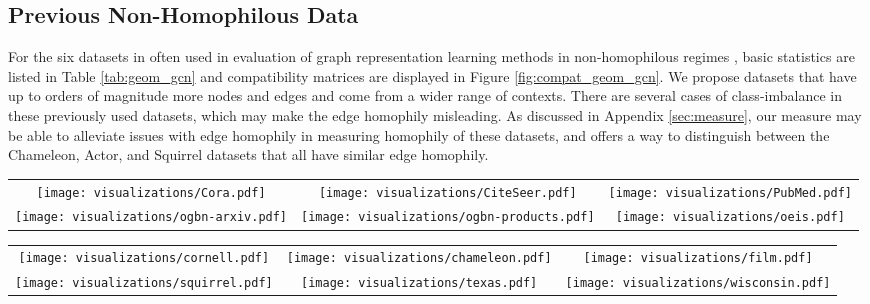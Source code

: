 \documentclass{article}
\begin{document}
\subsection{Previous Non-Homophilous Data}

For the six datasets in \citet{pei2019geom} often used in evaluation of graph representation learning methods in non-homophilous regimes \cite{zhu2020beyond}, basic statistics are listed in Table \ref{tab:geom_gcn} and compatibility matrices are displayed in Figure \ref{fig:compat_geom_gcn}. We propose datasets that have up to orders of magnitude more nodes and edges and come from a wider range of contexts. There are several cases of class-imbalance in these previously used datasets, which may make the edge homophily misleading. As discussed in Appendix \ref{sec:measure}, our measure may be able to alleviate issues with edge homophily in measuring homophily of these datasets, and offers a way to distinguish between the Chameleon, Actor, and Squirrel datasets that all have similar edge homophily.

\begin{figure*}[t]
\centering
\begin{tabular}{ccc}
    \texttt{[image: visualizations/Cora.pdf]} &
    \texttt{[image: visualizations/CiteSeer.pdf]} &
    \texttt{[image: visualizations/PubMed.pdf]} \\
    \texttt{[image: visualizations/ogbn-arxiv.pdf]} &
    \texttt{[image: visualizations/ogbn-products.pdf]} &
    \texttt{[image: visualizations/oeis.pdf]}
\end{tabular}
\caption{Compatibility matrices of homophilic datasets. The diagonal dominance indicates strong homophily.}
\label{fig:compat_homophilic}
\end{figure*}

\begin{figure*}[t]
\centering
\begin{tabular}{ccc}
    \texttt{[image: visualizations/cornell.pdf]} &
    \texttt{[image: visualizations/chameleon.pdf]} &
    \texttt{[image: visualizations/film.pdf]} \\
    \texttt{[image: visualizations/squirrel.pdf]} &
    \texttt{[image: visualizations/texas.pdf]}  &
    \texttt{[image: visualizations/wisconsin.pdf]}
\end{tabular}
\caption{Compatibility matrices of datasets in \citet{pei2019geom} (collected by \cite{rozemberczki2019multi, tang2009social, mitchell1997web}). The ``film'' dataset is also referred to as ``Actor''. Note that there are no edges leading out of the nodes of class 1 in the Cornell dataset, so there is an empty row in its matrix.}
\label{fig:compat_geom_gcn}
\end{figure*}
\end{document}
